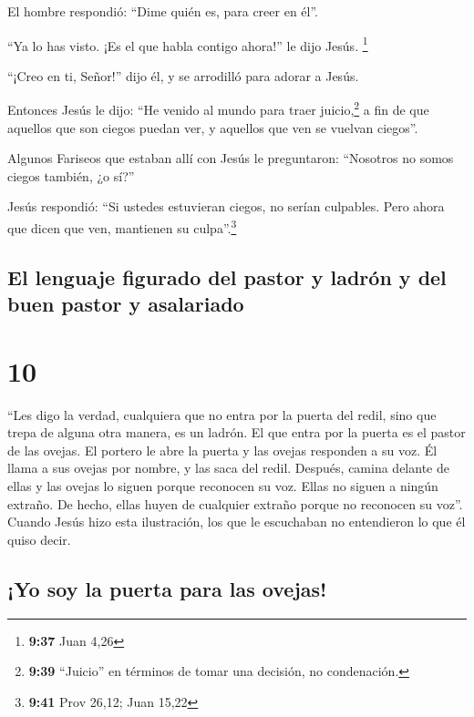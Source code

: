  El hombre respondió: ``Dime quién es, para creer en
él''.

 ``Ya lo has visto. ¡Es el que habla contigo ahora!'' le
dijo Jesús. \footnote{\textbf{9:37} Juan 4,26}

 ``¡Creo en ti, Señor!'' dijo él, y se arrodilló para
adorar a Jesús.

 Entonces Jesús le dijo: ``He venido al mundo para traer
juicio,\footnote{\textbf{9:39} ``Juicio'' en términos de tomar una
  decisión, no condenación.} a fin de que aquellos que son ciegos puedan
ver, y aquellos que ven se vuelvan ciegos''.

 Algunos Fariseos que estaban allí con Jesús le
preguntaron: ``Nosotros no somos ciegos también, ¿o sí?''

 Jesús respondió: ``Si ustedes estuvieran ciegos, no
serían culpables. Pero ahora que dicen que ven, mantienen su
culpa''.\footnote{\textbf{9:41} Prov 26,12; Juan 15,22}

\hypertarget{el-lenguaje-figurado-del-pastor-y-ladruxf3n-y-del-buen-pastor-y-asalariado}{%
\subsection{El lenguaje figurado del pastor y ladrón y del buen pastor y
asalariado}\label{el-lenguaje-figurado-del-pastor-y-ladruxf3n-y-del-buen-pastor-y-asalariado}}

\hypertarget{section-9}{%
\section{10}\label{section-9}}

 ``Les digo la verdad, cualquiera que no entra por la
puerta del redil, sino que trepa de alguna otra manera, es un ladrón.
 El que entra por la puerta es el pastor de las ovejas.
 El portero le abre la puerta y las ovejas responden a su
voz. Él llama a sus ovejas por nombre, y las saca del redil.
 Después, camina delante de ellas y las ovejas lo siguen
porque reconocen su voz.  Ellas no siguen a ningún
extraño. De hecho, ellas huyen de cualquier extraño porque no reconocen
su voz''.  Cuando Jesús hizo esta ilustración, los que le
escuchaban no entendieron lo que él quiso decir.

\hypertarget{yo-soy-la-puerta-para-las-ovejas}{%
\subsection{¡Yo soy la puerta para las
ovejas!}\label{yo-soy-la-puerta-para-las-ovejas}}

